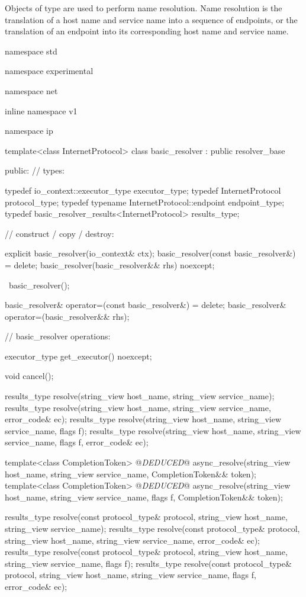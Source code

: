 \pnum
Objects of type  are used to perform name resolution. Name resolution is the translation of a host name and service name into a sequence of endpoints, or the translation of an endpoint into its corresponding host name and service name.

\begin{codeblock}
namespace std {
namespace experimental {
namespace net {
inline namespace v1 {
namespace ip {

  template<class InternetProtocol>
  class basic_resolver : public resolver_base
  {
  public:
    // types:

    typedef io_context::executor_type executor_type;
    typedef InternetProtocol protocol_type;
    typedef typename InternetProtocol::endpoint endpoint_type;
    typedef basic_resolver_results<InternetProtocol> results_type;

    // construct / copy / destroy:

    explicit basic_resolver(io_context& ctx);
    basic_resolver(const basic_resolver&) = delete;
    basic_resolver(basic_resolver&& rhs) noexcept;

    ~basic_resolver();

    basic_resolver& operator=(const basic_resolver&) = delete;
    basic_resolver& operator=(basic_resolver&& rhs);

    // basic_resolver operations:

    executor_type get_executor() noexcept;

    void cancel();

    results_type resolve(string_view host_name, string_view service_name);
    results_type resolve(string_view host_name, string_view service_name,
                         error_code& ec);
    results_type resolve(string_view host_name, string_view service_name,
                         flags f);
    results_type resolve(string_view host_name, string_view service_name,
                         flags f, error_code& ec);

    template<class CompletionToken>
      @\textit{DEDUCED}@ async_resolve(string_view host_name, string_view service_name,
                            CompletionToken&& token);
    template<class CompletionToken>
      @\textit{DEDUCED}@ async_resolve(string_view host_name, string_view service_name,
                            flags f, CompletionToken&& token);

    results_type resolve(const protocol_type& protocol,
                         string_view host_name, string_view service_name);
    results_type resolve(const protocol_type& protocol,
                         string_view host_name, string_view service_name,
                         error_code& ec);
    results_type resolve(const protocol_type& protocol,
                         string_view host_name, string_view service_name,
                         flags f);
    results_type resolve(const protocol_type& protocol,
                         string_view host_name, string_view service_name,
                         flags f, error_code& ec);

}}}}}}
\end{codeblock}
